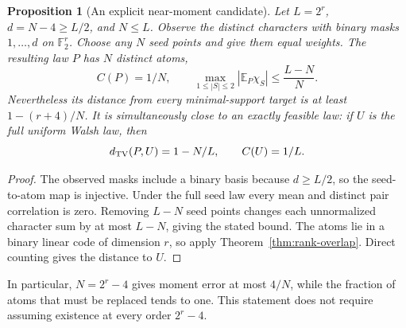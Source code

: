 \documentclass[11pt]{article}
\newtheorem{proposition}[theorem]{Proposition}
\begin{document}
\begin{proposition}[An explicit near-moment candidate]
\label{prop:rank-walsh-candidate}
Let $L=2^r$, $d=N-4\ge L/2$, and $N\le L$. Observe the distinct
characters with binary masks $1,\ldots,d$ on $\mathbb F_2^r$.
Choose any $N$ seed points and give them equal weights. The resulting
law $P$ has $N$ distinct atoms,
\[
 C(P)=1/N,\qquad
 \max_{1\le|S|\le2}|\mathbb E_P\chi_S|\le\frac{L-N}{N}.
\]
Nevertheless its distance from every minimal-support target is at
least $1-(r+4)/N$.
It is simultaneously close to an exactly feasible law: if $U$ is
the full uniform Walsh law, then
\[
 d_{\rm TV}(P,U)=1-N/L,\qquad C(U)=1/L.
\]
\end{proposition}
\begin{proof}
The observed masks include a binary basis because $d\ge L/2$, so
the seed-to-atom map is injective. Under the full seed law every
mean and distinct pair correlation is zero. Removing $L-N$ seed
points changes each unnormalized character sum by at most $L-N$,
giving the stated bound. The atoms lie in a binary linear code of
dimension $r$, so apply Theorem~\ref{thm:rank-overlap}. Direct counting
gives the distance to $U$.
\end{proof}
In particular, $N=2^r-4$ gives moment error at most $4/N$, while the
fraction of atoms that must be replaced tends to one. This statement
does not require assuming existence at every order $2^r-4$.
\end{document}
